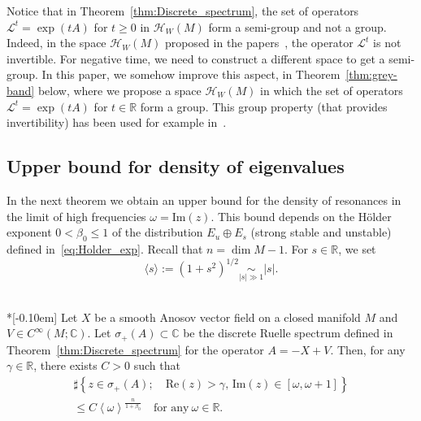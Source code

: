 \documentclass[AHL,Unicode,longabstracts,published]{cedram}
\newcommand{\clH}{\mathcal{H}}
\newcommand{\clL}{\mathcal{L}}
\newcommand{\Ree}{\mathrm{Re}}
\newcommand{\Imm}{\mathrm{Im}}
\newcommand{\bbR}{\mathbb{R}}
\newcommand{\bbC}{\mathbb{C}}
\newcommand{\Imm}{\mathrm{Im}}
\newcommand{\Ree}{\mathrm{Re}}
\newcommand{\clH}{\mathcal{H}}
\newcommand{\bbR}{\mathbb{R}}
\begin{document}
\begin{rema}
Notice that in Theorem~\ref{thm:Discrete_spectrum}, the set of operators $\clL^{t}=\exp(tA)$ for $t\geq0$ in $\clH _{W}(M)$ form a semi-group and not a group. Indeed, in the space $\clH _{W}(M)$ proposed in the papers~\cite{liverani_butterley_07,fred_flow_09}, the operator $\clL^{t}$ is not invertible. For negative time, we need to construct a different space to get a semi-group. In this paper, we somehow improve this aspect, in Theorem~\ref{thm:grey-band} below, where we propose a space $\clH _{W}(M)$ in which the set of operators $\clL^{t}=\exp(tA)$ for $t\in\bbR$ form a group. This group property (that provides invertibility) has been used for example in~\cite{faure-tsujii_anosov_flows_16}.
\end{rema}


\subsection{Upper bound for density of eigenvalues}
In the next theorem we obtain an upper bound for the density of resonances in the limit of high frequencies $\omega=\Imm(z)$. This bound depends on the H\"older exponent $0<\beta_{0}\leq1$ of the distribution $E_{u}\oplus E_{s}$ (strong stable and unstable) defined in~\eqref{eq:Holder_exp}. Recall that $n=\dim M-1$. For $s\in\bbR$, we set
\begin{equation}\label{eq:def_Japonese_bracket}
\langle s\rangle:=\left(1+s^{2}\right)^{1/2}\underset{\left|s\right|\gg1}{\sim}\left|s\right|.
\end{equation}

\begin{tcolorbox}[enhanced, frame style={teal!80}, interior style={cyan!0},breakable]
\begin{theo}\label{thm:Weyl law}\ \\*[-0.10em]
Let $X$ be a smooth Anosov vector field on a closed manifold $M$ and $V\in C^{\infty}(M;\bbC)$. Let $\sigma_{+}(A)\subset\bbC$ be the discrete Ruelle spectrum defined in Theorem~\ref{thm:Discrete_spectrum} for the operator $A=-X+V$. Then, for any $\gamma\in\bbR$, there exists $C>0$ such that
\begin{multline}\label{eq:weyl_upper_bound}
\sharp\left\{ z\in\sigma_{+}\left(A\right);\quad\Ree\left(z\right)>\gamma,\,\Imm\left(z\right)\in\left[\omega,\omega+1\right]\right\}\\ \leq C\left\langle \omega\right\rangle ^{\frac{n}{1+\beta_{0}}} \quad\text{for any}\:\omega\in\bbR.
\end{multline}
\end{theo}
\end{tcolorbox}
\end{document}
